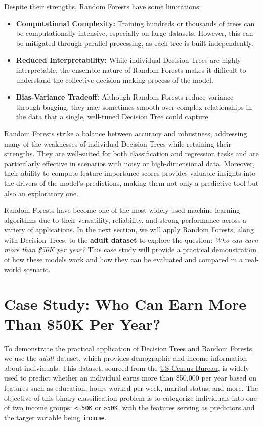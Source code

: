 \documentclass[
]{book}
\newcommand{\passthrough}[1]{#1}
\providecommand{\tightlist}{%
  \setlength{\itemsep}{0pt}\setlength{\parskip}{0pt}}
\theoremstyle{definition}
\theoremstyle{definition}
\theoremstyle{definition}
\theoremstyle{definition}
\theoremstyle{remark}
\begin{document}
Despite their strengths, Random Forests have some limitations:

\begin{itemize}
\tightlist
\item
  \textbf{Computational Complexity:} Training hundreds or thousands of trees can be computationally intensive, especially on large datasets. However, this can be mitigated through parallel processing, as each tree is built independently.\\
\item
  \textbf{Reduced Interpretability:} While individual Decision Trees are highly interpretable, the ensemble nature of Random Forests makes it difficult to understand the collective decision-making process of the model.\\
\item
  \textbf{Bias-Variance Tradeoff:} Although Random Forests reduce variance through bagging, they may sometimes smooth over complex relationships in the data that a single, well-tuned Decision Tree could capture.
\end{itemize}

Random Forests strike a balance between accuracy and robustness, addressing many of the weaknesses of individual Decision Trees while retaining their strengths. They are well-suited for both classification and regression tasks and are particularly effective in scenarios with noisy or high-dimensional data. Moreover, their ability to compute feature importance scores provides valuable insights into the drivers of the model's predictions, making them not only a predictive tool but also an exploratory one.

Random Forests have become one of the most widely used machine learning algorithms due to their versatility, reliability, and strong performance across a variety of applications. In the next section, we will apply Random Forests, along with Decision Trees, to the \textbf{adult dataset} to explore the question: \emph{Who can earn more than \$50K per year?} This case study will provide a practical demonstration of how these models work and how they can be evaluated and compared in a real-world scenario.

\section{Case Study: Who Can Earn More Than \$50K Per Year?}\label{tree-case-study}

To demonstrate the practical application of Decision Trees and Random Forests, we use the \emph{adult} dataset, which provides demographic and income information about individuals. This dataset, sourced from the \href{https://www.census.gov}{US Census Bureau}, is widely used to predict whether an individual earns more than \$50,000 per year based on features such as education, hours worked per week, marital status, and more. The objective of this binary classification problem is to categorize individuals into one of two income groups: \passthrough{\lstinline!<=50K!} or \passthrough{\lstinline!>50K!}, with the features serving as predictors and the target variable being \passthrough{\lstinline!income!}.
\end{document}
